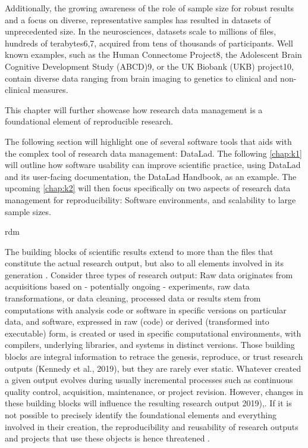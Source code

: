 Additionally, the growing awareness of the role of sample size for robust results \citep{button2013power} \citep{turner2018small} and a focus on diverse, representative samples has resulted in datasets of unprecedented size.
In the neurosciences, datasets scale to millions of files, hundreds of terabytes6,7, acquired from tens of thousands of participants. Well known examples, such as the Human Connectome Project8, the Adolescent Brain Cognitive Development Study (ABCD)9, or the UK Biobank (UKB) project10, contain diverse data ranging from brain imaging to genetics to clinical and non-clinical measures.

This chapter will further showcase how research data management is a foundational element of reproducible research.



The following section will highlight one of several software tools that aids with the complex tool of research data management: DataLad. The following \cref{chap:k1} will outline how software usability can improve scientific practice, using DataLad and its user-facing documentation, the DataLad Handbook, as an example.
The upcoming \cref{chap:k2} will then focus specifically on two aspects of research data management for reproducibility: Software environments, and scalability to large sample sizes.


\gls{rdm}



The building blocks of scientific results extend to more than the files that constitute the actual research output, but also to all elements involved in its generation \citep{claerbout1992electronic}.
Consider three types of research output: Raw data originates from acquisitions based on - potentially ongoing - experiments, raw data transformations, or data cleaning, processed data or results stem from computations with analysis code or software in specific versions on particular data, and software, expressed in raw (code) or derived (transformed into executable) form, is created or used in specific computational environments, with compilers, underlying libraries, and systems in distinct versions.
Those building blocks are integral information to retrace the genesis, reproduce, or trust research outputs (Kennedy et al., 2019), but they are rarely ever static.
Whatever created a given output evolves during usually incremental processes such as continuous quality control, acquisition, maintenance, or project revision.
However, changes in these building blocks will influence the resulting research output \citep{kennedy2019everything} 2019),\citep{glatard2015reproducibility}.
If it is not possible to precisely identify the foundational elements and everything involved in their creation, the reproducibility and reusability of research outputs and projects that use these objects is hence threatened \citep{kennedy2019everything}.

